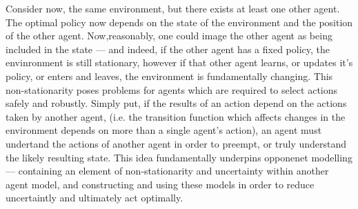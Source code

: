 \newline \newline
Consider now, the same environment, but there exists at least one other agent. The optimal policy now depends on the state of the environment and the position of the other agent. Now,reasonably, one could image the other agent as being included in the state --- and indeed, if the other agent has a fixed policy, the envinronment is still stationary, however if that other agent learns, or updates it's policy, or enters and leaves, the environment is fundamentally changing.
\newline\newline
This non-stationarity poses problems for agents which are required to select actions safely and robustly. Simply put, if the results of an action depend on the actions taken by another agent, (i.e. the transition function which affects changes in the environment depends on more than a single agent's action), an agent must undertand the actions of another agent in order to preempt, or truly understand the likely resulting state. This idea fundamentally underpins opponenet modelling --- containing an element of non-stationarity and uncertainty within another agent model, and constructing and using these models in order to reduce uncertaintly and ultimately act optimally. 
